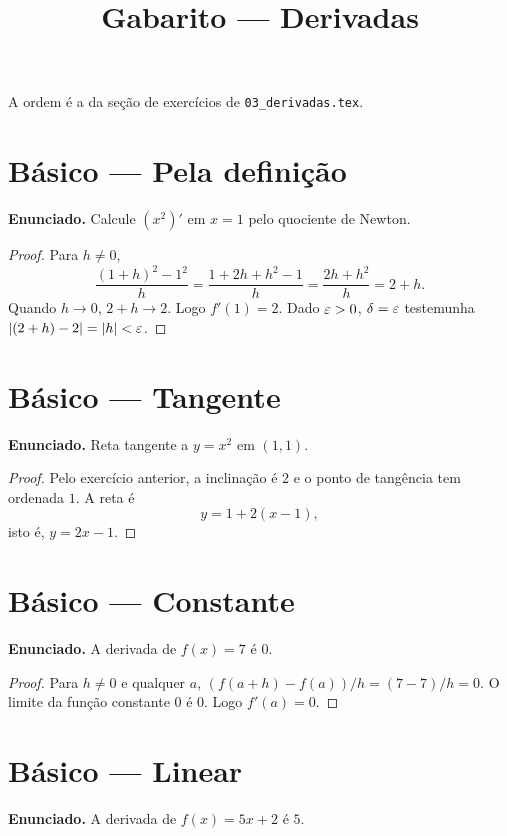 \documentclass[11pt,a4paper]{article}
\title{Gabarito --- Derivadas}
\author{}
\date{}
\begin{document}
\maketitle
\tableofcontents

A ordem \'e a da se\c{c}\~ao de exerc\'icios de \texttt{03\_derivadas.tex}.

\section{B\'asico --- Pela defini\c{c}\~ao}

\textbf{Enunciado.} Calcule $(x^2)'$ em $x=1$ pelo quociente de Newton.

\begin{proof}
Para $h\neq 0$,
\[
\frac{(1+h)^2-1^2}{h}=\frac{1+2h+h^2-1}{h}=\frac{2h+h^2}{h}=2+h.
\]
Quando $h\to 0$, $2+h\to 2$. Logo $f'(1)=2$. Dado $\varepsilon>0$, $\delta=\varepsilon$ testemunha $\left\lvert (2+h)-2 \right\rvert=\left\lvert h \right\rvert<\varepsilon$.
\end{proof}

\section{B\'asico --- Tangente}

\textbf{Enunciado.} Reta tangente a $y=x^2$ em $(1,1)$.

\begin{proof}
Pelo exerc\'icio anterior, a inclina\c{c}\~ao \'e $2$ e o ponto de tang\^encia tem ordenada $1$. A reta \'e
\[
y=1+2(x-1),
\]
isto \'e, $y=2x-1$.
\end{proof}

\section{B\'asico --- Constante}

\textbf{Enunciado.} A derivada de $f(x)=7$ \'e $0$.

\begin{proof}
Para $h\neq 0$ e qualquer $a$, $(f(a+h)-f(a))/h=(7-7)/h=0$. O limite da fun\c{c}\~ao constante $0$ \'e $0$. Logo $f'(a)=0$.
\end{proof}

\section{B\'asico --- Linear}

\textbf{Enunciado.} A derivada de $f(x)=5x+2$ \'e $5$.
\end{document}
